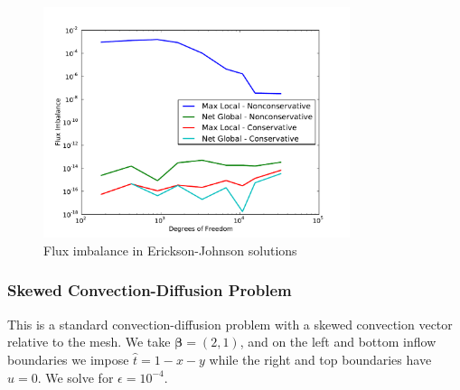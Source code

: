 \documentclass[letterpaper]{article}
\def\bbeta{\boldsymbol\beta}
\begin{document}
\begin{figure}[h!]
\centering
\includegraphics[width=0.8\textwidth]{figs/Erickson/graphFlux.pdf}
\caption{Flux imbalance in Erickson-Johnson solutions}
\label{ericksonFlux}
\end{figure}

\subsubsection{Skewed Convection-Diffusion Problem}
This is a standard convection-diffusion problem with a skewed convection
vector relative to the mesh. We take $\bbeta=(2,1)$, and on the left and
bottom inflow boundaries we impose $\hat t=1-x-y$ while the right and top
boundaries have $\hat u=0$. We solve for $\epsilon=10^{-4}$. 
\end{document}
